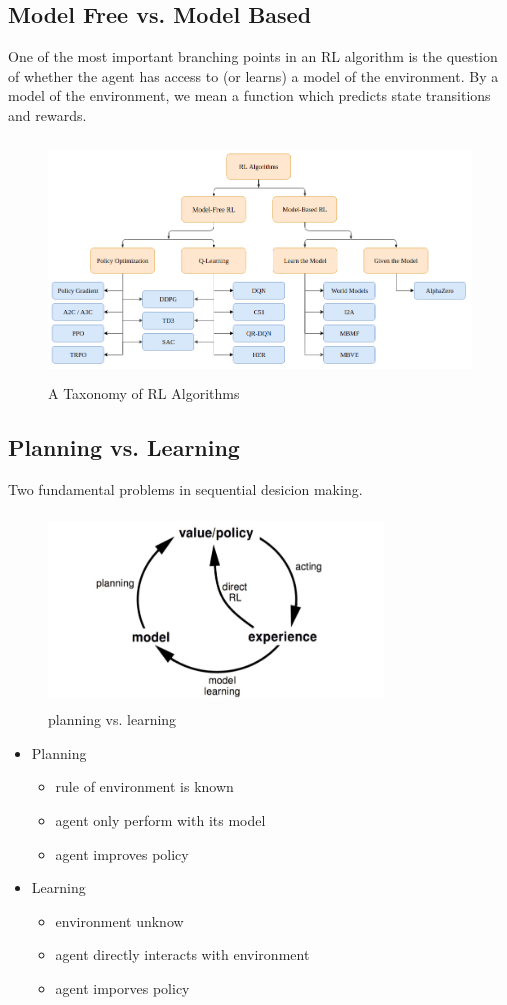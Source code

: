 \documentclass{article}
\begin{document}
\begin{CJK*}{UTF8}{gbsn}
\section{Model Free vs. Model Based}
One of the most important branching points in an RL algorithm is the question of whether the agent has access to (or learns) a model of the environment. By a model of the environment, we mean a function which predicts state transitions and rewards.

\begin{figure}[H]
\centering
\includegraphics[width=5in,height=2.5in]{taxonomy2}
\caption{A Taxonomy of RL Algorithms}
\end{figure}

\subsection{Planning vs. Learning}
Two fundamental problems in sequential desicion making.


\begin{figure}[H]
\centering
\includegraphics[width=3.5in,height=2in]{planning}
\caption{planning vs. learning}
\end{figure}


\begin{itemize}
\item Planning
\begin{itemize}
\item rule of environment is known
\item agent only perform with its model
\item agent improves policy
\end{itemize}
\item Learning
\begin{itemize}
\item environment unknow
\item agent directly interacts with environment
\item agent imporves policy
\end{itemize}
\end{itemize}



\end{CJK*}
\end{document}
